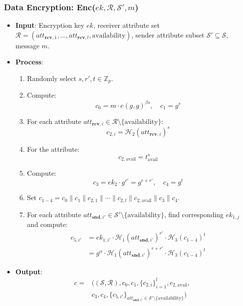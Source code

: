\documentclass[runningheads]{llncs}
\begin{document}
\subsubsection{Data Encryption: Enc($ek, \mathcal{R}, \mathcal{S}', m$)}
\begin{itemize}
    \item \textbf{Input}: Encryption key $ek$, receiver attribute set $\mathcal{R} = (att_{\mathbf{rcv},1}, \ldots, att_{\mathbf{rcv},l}, \text{availability})$, sender attribute subset $\mathcal{S}' \subseteq \mathcal{S}$, message $m$.
    \item \textbf{Process}:
    \begin{enumerate}
        \item Randomly select $s, r', t \in \mathbb{Z}_p$.
        \item Compute:
        \[
        c_0 = m \cdot e(g,g)^{\beta s}, \quad c_1 = g^s
        \]
        \item For each attribute $att_{\mathbf{rcv},i} \in \mathcal{R} \setminus \{\text{availability}\}$:
        \[
        c_{2,i} = \mathcal{H}_2(att_{\mathbf{rcv},i})^s
        \]
        \item For the  attribute:
        \[
        c_{2,\text{avail}} = t_{\text{avail}}^s
        \]
        \item Compute:
        \[
        c_3 = ek_2 \cdot g^{r'} = g^{r + r'}, \quad c_4 = g^t
        \]
        \item Set $c_{1-4} = c_0 \parallel c_1 \parallel c_{2,1} \parallel \cdots \parallel c_{2,l} \parallel c_{2,\text{avail}} \parallel c_3 \parallel c_4$.
        \item For each attribute $att_{\mathbf{snd},i'} \in \mathcal{S}' \setminus \{\text{availability}\}$, find corresponding $ek_{1,j}$ and compute:
        $$\begin{aligned}
        c_{5,i'} &= ek_{1,i'} \cdot \mathcal{H}_1(att_{\mathbf{snd},i'})^{r'} \cdot \mathcal{H}_3(c_{1-4})^t \\
            &= g^\alpha \cdot  \mathcal{H}_1(att_{\mathbf{snd},i'})^{r+r'} \cdot \mathcal{H}_3(c_{1-4})^t
        \end{aligned}$$
    \end{enumerate}
    \item \textbf{Output}:
    \[
        \begin{aligned}
        c = &((\mathcal{S}, \mathcal{R}), c_0, c_1, \{c_{2,i}\}_{i=1}^l, c_{2,\text{avail}}, \\
        &c_3, c_4, \{c_{5,i'}\}_{att_{\mathbf{snd},i'} \in \mathcal{S}' \setminus \{\text{availability}\}})

\end{aligned}\]
\end{itemize}
\end{document}
